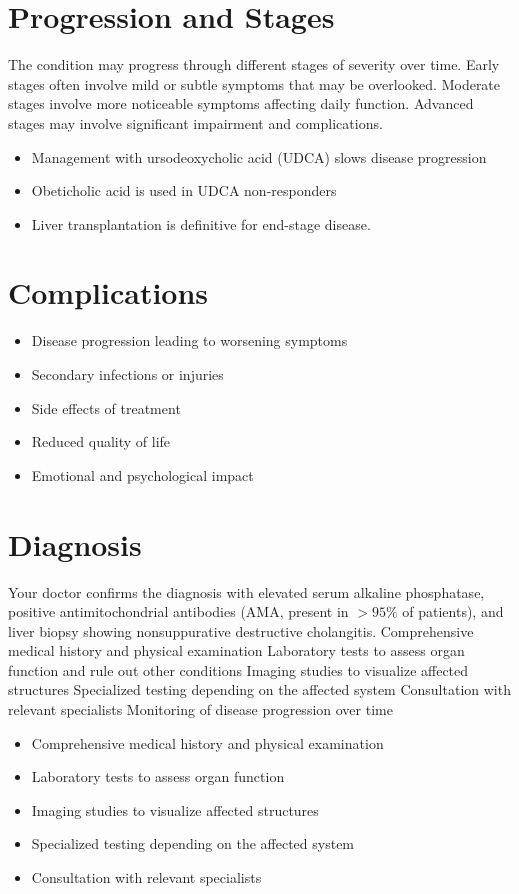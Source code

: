 \section{Progression and Stages}
The condition may progress through different stages of severity over time. Early stages often involve mild or subtle symptoms that may be overlooked. Moderate stages involve more noticeable symptoms affecting daily function. Advanced stages may involve significant impairment and complications.

\begin{itemize}[noitemsep]
  \item Management with ursodeoxycholic acid (UDCA) slows disease progression
  \item Obeticholic acid is used in UDCA non-responders
  \item Liver transplantation is definitive for end-stage disease.
\end{itemize}
\section{Complications}
\begin{itemize}[noitemsep]
  \item Disease progression leading to worsening symptoms
  \item Secondary infections or injuries
  \item Side effects of treatment
  \item Reduced quality of life
  \item Emotional and psychological impact
\end{itemize}
\section{Diagnosis}
Your doctor confirms the diagnosis with elevated serum alkaline phosphatase, positive antimitochondrial antibodies (AMA, present in $>95\%$ of patients), and liver biopsy showing nonsuppurative destructive cholangitis. Comprehensive medical history and physical examination Laboratory tests to assess organ function and rule out other conditions Imaging studies to visualize affected structures Specialized testing depending on the affected system Consultation with relevant specialists Monitoring of disease progression over time

\begin{itemize}[noitemsep]
  \item Comprehensive medical history and physical examination
  \item Laboratory tests to assess organ function
  \item Imaging studies to visualize affected structures
  \item Specialized testing depending on the affected system
  \item Consultation with relevant specialists
\end{itemize}
